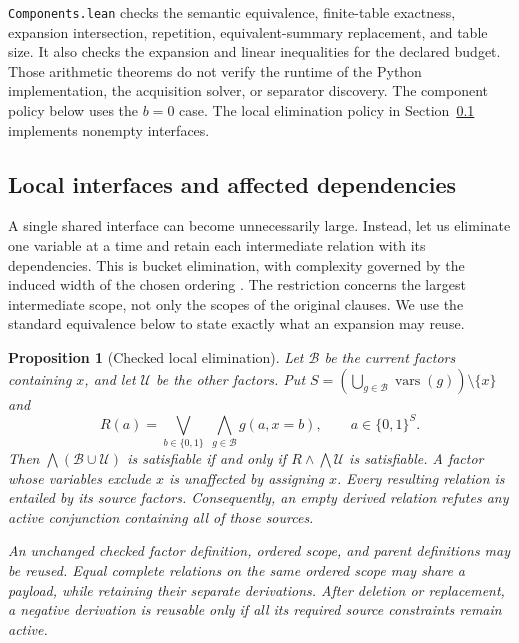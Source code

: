 \documentclass[11pt,a4paper]{article}
\numberwithin{equation}{section}
\newcommand{\bits}{\{0,1\}}
\theoremstyle{plain}
\newtheorem{proposition}[lemma]{Proposition}
\theoremstyle{definition}
\theoremstyle{remark}
\begin{document}
\texttt{Components.lean} checks the semantic equivalence, finite-table exactness, expansion intersection, repetition, equivalent-summary replacement, and table size. It also checks the expansion and linear inequalities for the declared budget. Those arithmetic theorems do not verify the runtime of the Python implementation, the acquisition solver, or separator discovery. The component policy below uses the $b=0$ case. The local elimination policy in Section~\ref{sec:local-interfaces} implements nonempty interfaces.


\subsection{Local interfaces and affected dependencies}
\label{sec:local-interfaces}

A single shared interface can become unnecessarily large. Instead, let us eliminate one variable at a time and retain each intermediate relation with its dependencies. This is bucket elimination, with complexity governed by the induced width of the chosen ordering \citep{dechter1999bucket}. The restriction concerns the largest intermediate scope, not only the scopes of the original clauses. We use the standard equivalence below to state exactly what an expansion may reuse.

\begin{proposition}[Checked local elimination]
\label{prop:local-elimination}
Let $\mathcal B$ be the current factors containing $x$, and let $\mathcal U$ be the other factors. Put $S=(\bigcup_{g\in\mathcal B}\operatorname{vars}(g))\setminus\{x\}$ and
\begin{equation}
R(a)=\bigvee_{b\in\bits}\;\bigwedge_{g\in\mathcal B}g(a,x=b),\qquad a\in\bits^S.
\label{eq:local-projection}
\end{equation}
Then $\bigwedge(\mathcal B\cup\mathcal U)$ is satisfiable if and only if $R\land\bigwedge\mathcal U$ is satisfiable. A factor whose variables exclude $x$ is unaffected by assigning $x$. Every resulting relation is entailed by its source factors. Consequently, an empty derived relation refutes any active conjunction containing all of those sources.

An unchanged checked factor definition, ordered scope, and parent definitions may be reused. Equal complete relations on the same ordered scope may share a payload, while retaining their separate derivations. After deletion or replacement, a negative derivation is reusable only if all its required source constraints remain active.
\end{proposition}
\end{document}
